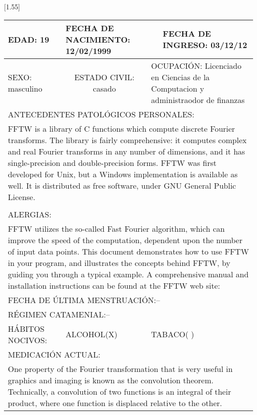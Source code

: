 \documentclass[10pt,a4paper]{article}
\begin{document}
\vspace{0.5cm}
\scalebox{1.40}[1.55]{
\begin{tabular}{|p{2cm}p{2cm}p{3cm}p{2cm}|} 
\hline 
\multicolumn{1}{|l}{\scriptsize{EDAD: 19}}& \multicolumn{2}{l}{ \scriptsize{FECHA DE NACIMIENTO: 12/02/1999}}& \multicolumn{1}{l|}{ \scriptsize{FECHA DE INGRESO: 03/12/12}}\\
\hline 
\multicolumn{1}{|l}{\scriptsize{SEXO: masculino}}& \multicolumn{1}{c}{ \scriptsize{ESTADO CIVIL: casado}}& \multicolumn{2}{p{7cm}|}{ \scriptsize{OCUPACI\'ON: Licenciado en Ciencias de la Computacion y administraodor de finanzas}}\\  
\hline 
\multicolumn{4}{|l|}{\scriptsize{ANTECEDENTES PATOL\'OGICOS PERSONALES:}}\\
\multicolumn{4}{|p{12.5cm}|}{\scriptsize{FFTW is a library of C functions which compute discrete Fourier transforms. The library is fairly comprehensive: it computes complex and real Fourier transforms in any number of dimensions, and it has single-precision and double-precision forms. FFTW was first developed for Unix, but a Windows implementation is available as well. It is distributed as free software, under GNU General Public License.}}\\ 
 & && \\
\hline 
\multicolumn{4}{|l|}{\scriptsize{ALERGIAS:}}\\ 
\multicolumn{4}{|p{12.5cm}|}{\scriptsize{FFTW utilizes the so-called Fast Fourier algorithm, which can improve the speed of the computation, dependent upon the number of input data points. This document demonstrates how to use FFTW in your program, and illustrates the concepts behind FFTW, by guiding you through a typical example. A comprehensive manual and installation instructions can be found at the FFTW web site:}}\\ 
\hline 
\multicolumn{4}{|l|}{\scriptsize{FECHA DE \'ULTIMA MENSTRUACI\'ON:--}}\\ 
\hline 
\multicolumn{4}{|l|}{\scriptsize{R\'EGIMEN CATAMENIAL:--}}\\
\hline 
\multicolumn{1}{|l}{\scriptsize{H\'ABITOS NOCIVOS:}}& \multicolumn{1}{l}{\scriptsize{ALCOHOL(X)}}&\multicolumn{2}{l|}{\scriptsize{TABACO( )}}\\
\hline 
\multicolumn{4}{|l|}{\scriptsize{MEDICACI\'ON ACTUAL:}}\\
\multicolumn{4}{|p{12.5cm}|}{\scriptsize{One property of the Fourier transformation that is very useful in graphics and imaging is known as the convolution theorem. Technically, a convolution of two functions is an integral of their product, where one function is displaced relative to the other. }}\\ 

\end{tabular}}
\end{document}
